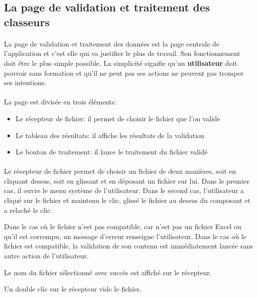 \subsection{La page de validation et traitement des classeurs}
\label{subsec:spreadsheet-page}

\paragraph{}
La page de validation et traitement des données est la page centrale de l'application et c'est elle qui va justifier le plus de travail.
Son fonctionnement doit être le plus simple possible. La simplicité signifie qu'un \textbf{utilisateur} doit pouvoir sans formation et qu'il ne peut pas ses actions ne peuvent pas tromper ses intentions.

\paragraph{}
La page est divisée en trois éléments:
\begin{itemize}
    \item Le récepteur de fichier: il permet de choisir le fichier que l'on valide
    \item Le tableau des résultats: il affiche les résultats de la validation
    \item Le bouton de traitement: il lance le traitement du fichier validé
\end{itemize}

\paragraph{}
Le récepteur de fichier permet de choisir un fichier de deux manières, soit en cliquant dessus, soit en glissant et en déposant un fichier sur lui.
Dans le premier cas, il ouvre le menu système\fnmark{} de l'utilisateur. Dans le second cas, l'utilisateur a cliqué sur le fichier et maintenu le clic, glissé le fichier au dessus du composant et a relaché le clic.

Dans le cas où le fichier n'est pas compatible, car n'est pas un fichier Excel ou qu'il est corrompu, un message d'erreur renseigne l'utilisateur.
Dans le cas où le fichier est compatible, la validation de son contenu est immédiatement lancée sans autre action de l'utilisateur.

Le nom du fichier sélectionné avec succès est affiché sur le récepteur.

Un double clic sur le récepteur vide le fichier.

